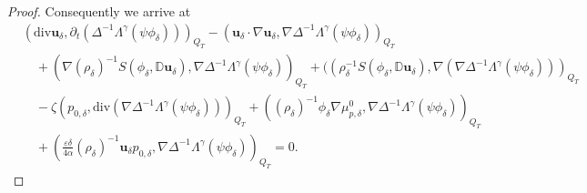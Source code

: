 \documentclass[10pt,a4paper]{amsart}
\begin{document}
\begin{proof}
				
				Consequently we arrive at
				\begin{align}\label{weak1111}
					&\nonumber(\mathrm{div}\mathbf{u}_{\delta},\partial_{t}(\Delta^{-1}\Lambda^{\gamma}(\psi\phi_{\delta})))_{Q_{T}}-(\mathbf{u}_{\delta}\cdot\nabla \mathbf{u}_{\delta},\nabla\Delta^{-1}\Lambda^{\gamma}(\psi\phi_{\delta}))_{Q_{T}}
					\\&\nonumber\quad+(\nabla(\rho_{\delta})^{-1}S(\phi_{\delta},\mathbb{ D}\mathbf{u}_{\delta}),\nabla\Delta^{-1}\Lambda^{\gamma}(\psi\phi_{\delta}))_{Q_{T}}+((\rho_{\delta}^{-1}S(\phi_{\delta},\mathbb{ D}\mathbf{u}_{\delta}),\nabla(\nabla\Delta^{-1}\Lambda^{\gamma}(\psi\phi_{\delta})))_{Q_{T}}
					\\&\nonumber\quad -\zeta(p_{0,\delta},\mathrm{div}(\nabla\Delta^{-1}\Lambda^{\gamma}(\psi\phi_{\delta})))_{Q_{T}}
					+((\rho_{\delta})^{-1}\phi_{\delta}\nabla\mu_{p,\delta}^{0},\nabla\Delta^{-1}\Lambda^{\gamma}(\psi\phi_{\delta}))_{Q_{T}}
					\\&\quad
					+(\frac{\varepsilon\delta}{4\alpha}(\rho_{\delta})^{-1}\mathbf{u}_{\delta}p_{0,\delta},\nabla\Delta^{-1}\Lambda^{\gamma}(\psi\phi_{\delta}))_{Q_{T}}=0.
				\end{align}
				

\end{proof}
\end{document}
